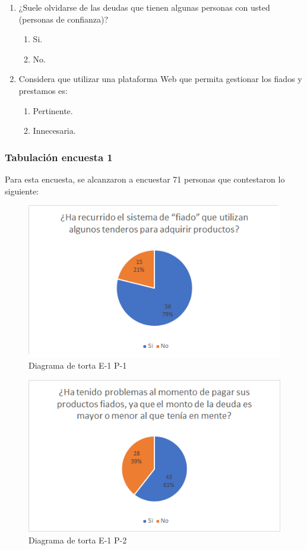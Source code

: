 {\begin{enumerate}
				\item ¿Suele olvidarse de las deudas que tienen algunas personas con usted (personas de confianza)?
				
					\begin{enumerate}
						\item Si.
						\item No.
					\end{enumerate}	
				
				\item Considera que utilizar una plataforma Web que permita gestionar los fiados y prestamos es:
				
					\begin{enumerate}
						\item Pertinente.
						\item Innecesaria.
					\end{enumerate}
				
			\end{enumerate}
		
		\subsubsection*{Tabulación encuesta 1}
		{Para esta encuesta, se alcanzaron a encuestar 71 personas que contestaron lo siguiente:
		
		\begin{figure}[H]
			\centering
			\includegraphics[width=0.8\linewidth]{annexes/e1-p1.png}
			\caption{Diagrama de torta E-1 P-1}
		\end{figure}
	
		\begin{figure}[H]
			\centering
			\includegraphics[width=0.8\linewidth]{annexes/e1-p2.png}
			\caption{Diagrama de torta E-1 P-2}
		\end{figure}
	
}}
